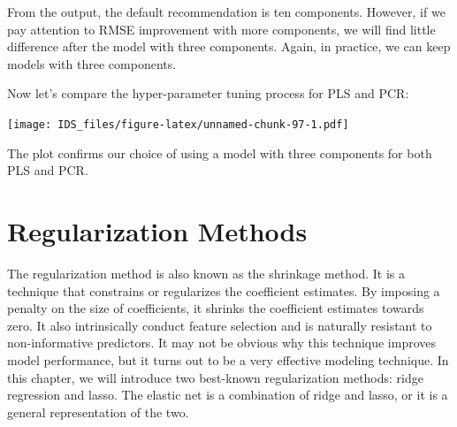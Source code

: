 \documentclass[
  12pt,
]{krantz}
\makeatletter
\newenvironment{Shaded}{\begin{snugshade}}{\end{snugshade}}
\newcommand{\AttributeTok}[1]{\textcolor[rgb]{0.61,0.61,0.61}{#1}}
\newcommand{\CommentTok}[1]{\textcolor[rgb]{0.37,0.37,0.37}{\textit{#1}}}
\newcommand{\DecValTok}[1]{\textcolor[rgb]{0.06,0.06,0.06}{#1}}
\newcommand{\FunctionTok}[1]{\textcolor[rgb]{0,0,0}{#1}}
\newcommand{\NormalTok}[1]{#1}
\newcommand{\OtherTok}[1]{\textcolor[rgb]{0.37,0.37,0.37}{#1}}
\newcommand{\SpecialCharTok}[1]{\textcolor[rgb]{0,0,0}{#1}}
\newcommand{\StringTok}[1]{\textcolor[rgb]{0.5,0.5,0.5}{#1}}
\newenvironment{kframe}{%
\medskip{}
\setlength{\fboxsep}{.8em}
 \def\at@end@of@kframe{}%
 \ifinner\ifhmode%
  \def\at@end@of@kframe{\end{minipage}}%
  \begin{minipage}{\columnwidth}%
 \fi\fi%
 \def\FrameCommand##1{\hskip\@totalleftmargin \hskip-\fboxsep
 \colorbox{shadecolor}{##1}\hskip-\fboxsep
     \hskip-\linewidth \hskip-\@totalleftmargin \hskip\columnwidth}%
 \MakeFramed {\advance\hsize-\width
   \@totalleftmargin\z@ \linewidth\hsize
   \@setminipage}}%
 {\par\unskip\endMakeFramed%
 \at@end@of@kframe}
\renewenvironment{Shaded}{\begin{kframe}}{\end{kframe}}
\makeatother
\begin{document}
From the output, the default recommendation is ten components. However, if we pay attention to RMSE improvement with more components, we will find little difference after the model with three components. Again, in practice, we can keep models with three components.

Now let's compare the hyper-parameter tuning process for PLS and PCR:

\begin{Shaded}
\end{Shaded}

\texttt{[image: IDS\_files/figure-latex/unnamed-chunk-97-1.pdf]}

The plot confirms our choice of using a model with three components for both PLS and PCR.

\hypertarget{regularization-methods}{%
\chapter{Regularization Methods}\label{regularization-methods}}

The regularization method is also known as the shrinkage method. It is a technique that constrains or regularizes the coefficient estimates. By imposing a penalty on the size of coefficients, it shrinks the coefficient estimates towards zero. It also intrinsically conduct feature selection and is naturally resistant to non-informative predictors. It may not be obvious why this technique improves model performance, but it turns out to be a very effective modeling technique. In this chapter, we will introduce two best-known regularization methods: ridge regression and lasso. The elastic net is a combination of ridge and lasso, or it is a general representation of the two.
\end{document}
